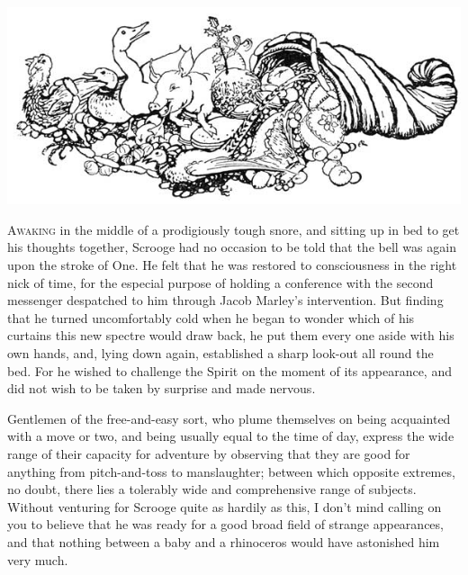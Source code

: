 \documentclass[paper=5.5in:8.5in,BCOR=15mm,twoside,DIV=15,headinclude=off,12pt,chapterprefix=off,openany,headings=huge]{scrbook} %
\begin{document}
\begin{minipage}[c]{\linewidth}
\includegraphics[width=\linewidth]{gs094}
\end{minipage}

\lettrine[loversize=.85]{A}{waking} in the middle of a prodigiously tough snore, and sitting up in bed to get his thoughts together, Scrooge had no occasion to be told that the bell was again upon the stroke of One. He felt that he was restored to consciousness in the right nick of time, for the especial purpose of holding a conference with the second messenger despatched to him through Jacob Marley's intervention. But finding that he turned uncomfortably cold when he began to wonder which of his curtains this new spectre would draw back, he put them every one aside with his own hands, and, lying down again, established a sharp look-out all round the bed. For he wished to challenge the Spirit on the moment of its appearance, and did not wish to be taken by surprise and made nervous.

Gentlemen of the free-and-easy sort, who plume themselves on being acquainted with a move or two, and being usually equal to the time of day, express the wide range of their capacity for adventure by observing that they are good for anything from pitch-and-toss to manslaughter; between which opposite extremes, no doubt, there lies a tolerably wide and comprehensive range of subjects. Without venturing for Scrooge quite as hardily as this, I don't mind calling on you to believe that he was ready for a good broad field of strange appearances, and that nothing between a baby and a rhinoceros would have astonished him very much.
\end{document}
